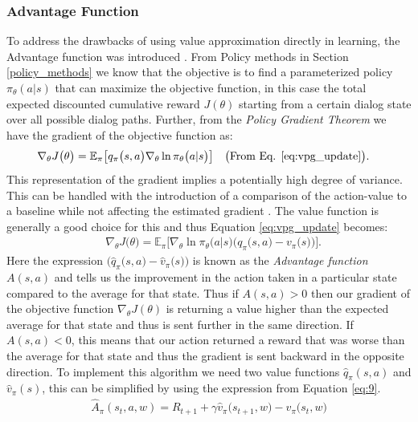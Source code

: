 \documentclass[14pt]{extarticle}
\numberwithin{equation}{section}
\begin{document}
	\subsubsection{Advantage Function}
	To address the drawbacks of using value approximation directly in learning, the Advantage function was introduced \cite{Sutton_pg}. From Policy methods in Section \ref{policy_methods} we know that the objective is to find a parameterized policy $\pi_{\theta}(a|s)$ that can maximize the objective function, in this case the total expected discounted cumulative reward $J(\theta)$ starting from a certain dialog state over all possible dialog paths. Further, from the \textit{Policy Gradient Theorem}\cite{Sutton-introRL} we have the gradient of the objective function as:
	\begin{align}
	& \nabla_{\theta}J\big(\theta\big) = \mathbb{E}_{\pi}\big[q_{\pi}\big(s,a\big)\nabla_{\theta}\ln\pi_{\theta}\big(a|s\big)\big]\nonumber &&\big(\text{From Eq. \ref{eq:vpg_update}}\big) .
	\end{align}
	This representation of the gradient implies a potentially high degree of variance. This can be handled with the introduction of a comparison of the action-value to a baseline while not affecting the estimated gradient \cite{Sutton-introRL}. The value function is generally a good choice for this and thus Equation \ref{eq:vpg_update} becomes: 
		\begin{align}
	& \nabla_{\theta}J\big(\theta\big) = \mathbb{E}_{\pi}\big[\nabla_{\theta}\ln\pi_{\theta}\big(a|s\big)\big(q_{\pi}\big(s,a\big) - v_{\pi}\big(s\big) \big)\big].\label{eq:baseline}
	\end{align}
	Here the expression $\big(\hat{q}_{\pi}\big(s,a\big) - \hat{v}_{\pi}\big(s\big) \big)$ is known as the \textit{Advantage function} $A(s,a)$ and tells us the improvement in the action taken in a particular state compared to the average for that state. Thus if $A(s,a) > 0$ then our gradient of the objective function $\nabla_{\theta}J(\theta)$ is returning a value higher than the expected average for that state and thus is sent further in the same direction. If $A(s,a) < 0$, this means that our action returned a reward that was worse than the average for that state and thus the gradient is sent backward in the opposite direction. To implement this algorithm we need two value functions $\hat{q}_{\pi}(s,a)$ and $\hat{v}_{\pi}(s)$, this can be simplified by using the expression from Equation \ref{eq:9}.
	\begin{align}
	\hat{A}_{\pi}(s_t,a,w)  = R_{t+1} + \gamma \hat{v}_{\pi}\big(s_{t+1},w\big) - \hat{v}_{\pi}\big(s_t,w\big) \label{eq:adv}
	\end{align}
\end{document}
